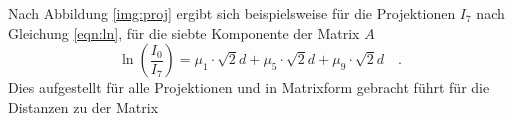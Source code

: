 
\noindent 
Nach Abbildung \ref{img:proj} ergibt sich beispielsweise für die Projektionen $I_7$ nach Gleichung \ref{eqn:ln}, für die siebte Komponente der Matrix $A$ 
\begin{equation*}
    \ln \left(\frac{I_0}{I_7}\right) = \mu_1 \cdot \sqrt{2}d + \mu_5 \cdot \sqrt{2}d +\mu_9 \cdot \sqrt{2}d \quad .
\end{equation*} 
Dies aufgestellt für alle Projektionen und in Matrixform gebracht führt für die Distanzen zu der Matrix




